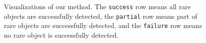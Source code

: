 {\begin{figure}[!ht]
{\begin{tabular}{ccccccc}
	\end{tabular}}
    \caption{Visualizations of our method. The \texttt{success} row means all rare objects are successfully detected, the \texttt{partial} row means part of rare objects are successfully detected, and the \texttt{failure} row means no rare object is successfully detected. \vspace{1mm}}
    \label{fig:det-vis}
\end{figure}}
